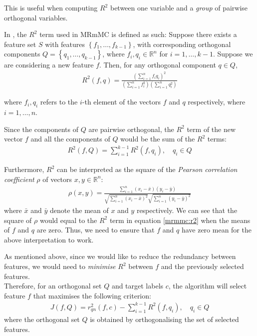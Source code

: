 \documentclass[12pt, twoside, a4paper]{report}
\begin{document}
This is useful when computing $R^2$ between one variable and a \textit{group} of pairwise orthogonal variables.

In \cite{RefWorks:187}, the $R^2$ term used in MRmMC is defined as such: Suppose there exists a feature set $S$ with features $\left\lbrace f_1 , \dots , f_{k-1} \right\rbrace$, with corresponding orthogonal components $Q= \left\lbrace q_1, \dots , q_{k-1} \right\rbrace$, where $f_i, q_i \in \mathbb{R}^n$ for $i=1, \dots, k-1$. Suppose we are considering a new feature $f$. Then, for any orthogonal component $q \in Q$,
\begin{align}
R^2(f, q) = \frac{\left( \sum_{i=1}^n f_iq_i \right)^2}{\left(\sum_{i=1}^n f_i^2 \right) \left( \sum_{i=1}^n q_i^2 \right)} \label{mrmmc:r2}
\end{align}

where $f_i,q_i$ refers to the $i$-th element of the vectors $f$ and $q$ respectively, where $i=1, \dots , n$.

Since the components of $Q$ are pairwise orthogonal, the $R^2$ term of the new vector $f$ and all the components of $Q$ would be the sum of the $R^2$ terms:
\begin{align*}
R^2(f, Q) = \sum_{i=1}^{k-1} R^2(f, q_i), \quad q_i \in Q
\end{align*}

Furthermore, $R^2$ can be interpreted as the square of the \textit{Pearson correlation coefficient} $\rho$ of vectors $x,y \in \mathbb{R}^n$:
\begin{align*}
\rho(x, y) = \frac{\sum_{i=1}^n (x_i - \bar{x})(y_i - \bar{y})}{\sqrt{\sum_{i=1}^n (x_i-\bar{x})^2}\sqrt{\sum_{i=1}^n (y_i-\bar{y})^2}}
\end{align*}
where $\bar{x}$ and $\bar{y}$ denote the mean of $x$ and $y$ respectively. We can see that the square of $\rho$ would equal to the $R^2$ term in equation \ref{mrmmc:r2} when the means of $f$ and $q$ are zero. Thus, we need to ensure that $f$ and $q$ have zero mean for the above interpretation to work.

As mentioned above, since we would like to reduce the redundancy between features, we would need to \textit{minimise} $R^2$ between $f$ and the previously selected features.\\

Therefore, for an orthogonal set $Q$ and target labels $c$, the algorithm will select feature $f$ that maximises the following criterion:
\begin{align*}
J(f, Q) = r_{qn}^2(f, c)- \sum_{i=1}^{k-1} R^2(f, q_i), \quad q_i \in Q
\end{align*}
where the orthogonal set $Q$ is obtained by orthogonalising the set of selected features.
\end{document}
